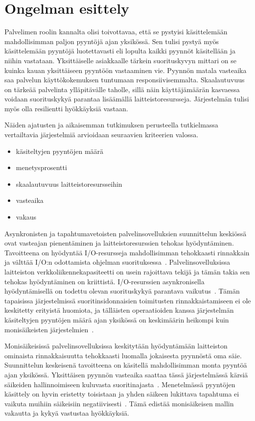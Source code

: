 \documentclass[12pt]{article}
\begin{document}
\section{}
\section{Ongelman esittely}

Palvelimen roolin kannalta olisi toivottavaa, että
se pystyisi käsittelemään mahdollisimman paljon pyyntöjä
ajan yksikössä. Sen tulisi pystyä myös käsittelemään pyyntöjä
luotettavasti eli lopulta kaikki pyynnöt käsitellään ja niihin vastataan.
Yksittäiselle asiakkaalle tärkein suorituskyvyn mittari on se kuinka kauan
yksittäiseen pyyntöön vastaaminen vie. Pyynnön matala vasteaika saa
palvelun käyttökokemuksen tuntumaan responsiivisemmalta.
Skaalautuvuus on tärkeää palvelinta ylläpitävälle taholle, sillä 
näin käyttäjämäärän kasvaessa voidaan suorituskykyä parantaa
lisäämällä laitteistoresursseja. Järjestelmän tulisi myös
olla resilientti hyökkäyksiä vastaan.

Näiden ajatusten ja aikaisemman tutkimuksen perusteella
tutkielmassa vertailtavia järjestelmiä arvioidaan seuraavien 
kriteerien valossa\cite{gokhale_performance_2006}.
\begin{itemize}
    \item käsiteltyjen pyyntöjen määrä
    \item menetysprosentti
    \item skaalautuvuus laitteistoresursseihin
    \item vasteaika
    \item vakaus
\end{itemize}
Asynkronisten ja tapahtumavetoisten palvelinsovelluksien suunnittelun keskiössä
ovat vasteajan pienentäminen ja laitteistoresurssien tehokas hyödyntäminen. 
Tavoitteena on hyödyntää I/O-resursseja mahdollisimman tehokkaasti
rinnakkain ja välttää I/O:n odottamista ohjelman suorituksessa~\cite{pai_flash:_nodate}. Palvelinsovelluksissa
laitteiston verkkoliikennekapasiteetti on usein rajoittava tekijä ja tämän takia
sen tehokas hyödyntäminen on kriittistä. I/O-resurssien asynkronisella hyödyntämisellä on todettu
olevan suorituskykyä parantava vaikutus~\cite{hu_applying_1998}.
Tämän tapaisissa järjestelmissä suoritinsidonnaisien
toimitusten rinnakkaistamiseen ei ole keskitetty erityistä huomiota, ja tälläisten operaatioiden
kanssa järjestelmän käsiteltyjen pyyntöjen määrä ajan yksikössä on keskimäärin heikompi
kuin monisäikeisten järjestelmien~\cite{davis_case_2017}.

Monisäikeisissä palvelinsovelluksissa keskitytään hyödyntämään laitteiston ominaista
rinnakkaisuutta tehokkaasti luomalla jokaisesta pyynnöstä oma säie. Suunnittelun keskeisenä
tavoitteena on käsitellä mahdollisimman monta pyyntöä ajan yksikössä. Yksittäisen pyynnön
vasteaika saattaa tässä
järjestelmässä kärsiä säikeiden hallinnoimiseen kuluvasta suoritinajasta~\cite{easton_developing_2004}.
Menetelmässä pyyntöjen käsittely on hyvin eristetty toisistaan ja
yhden säikeen lukittava tapahtuma ei vaikuta muihiin säikeisiin negatiivisesti~\cite{davis_case_2017}.
Tämä edistää monisäikeisen mallin vakautta ja kykyä vastustaa hyökkäyksiä.




\end{document}
